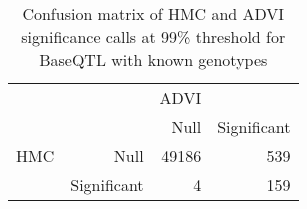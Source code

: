 \begin{table}[ht]
\centering
\caption{Confusion matrix of HMC and ADVI significance calls at 99\% threshold for BaseQTL with known genotypes} 
\label{tab:GT-xtab-99}
\begin{tabular}{rr|rr}
   &  & ADVI &  \\ 
    &   & Null & Significant \\ 
   \hline
HMC & Null & 49186 & 539 \\ 
    & Significant & 4 & 159 \\ 
  \end{tabular}
\end{table}
